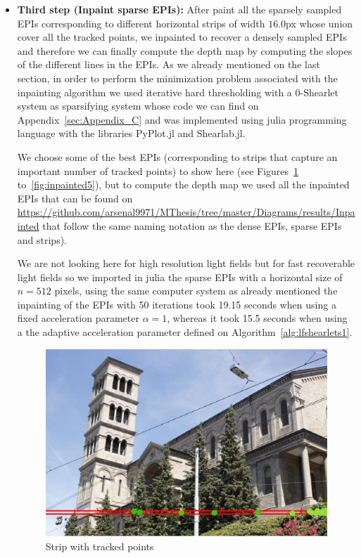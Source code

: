 \begin{itemize}
\item \textbf{Third step (Inpaint sparse EPIs):} After paint all the sparsely sampled EPIs corresponding to different horizontal strips of width $16.0$px whose union cover all the tracked points, we inpainted to recover a densely sampled EPIs and therefore we can finally compute the depth map by computing the slopes of the different lines in the EPIs. As we already mentioned on the last section, in order to perform the minimization problem associated with the inpainting algorithm we used iterative hard thresholding with a $0$-Shearlet system as sparsifying system whose code we can find on Appendix~\ref{sec:Appendix_C} and was implemented using julia programming language with the libraries PyPlot.jl and Shearlab.jl. 

\bigskip

We choose some of the best EPIs (corresponding to strips that capture an important number of tracked points) to show here (see Figures~\ref{fig:strip1} to~\ref{fig:inpainted5}), but to compute the depth map we used all the inpainted EPIs that can be found on \url{https://github.com/arsenal9971/MThesis/tree/master/Diagrams/results/Inpainted} that follow the same naming notation as the dense EPIs, sparse EPIs and strips).

\bigskip

We are not looking here for high resolution light fields but for fast recoverable light fields so we imported in julia the sparse EPIs with a horizontal size of $n=512$ pixels, using the same computer system as already mentioned the inpainting of the EPIs with 50 iterations took 19.15 seconds when using a fixed acceleration parameter $\alpha = 1$, whereas it took 15.5 seconds when using a the adaptive acceleration parameter defined on Algorithm~\ref{alg:lfshearlets1}.

\begin{figure}[h!]
\centering
\includegraphics[width = 0.7 \textwidth]{./Diagrams/results/EPIs/392_8_102_7_15_4_strip.png}
\caption{Strip with tracked points}
\label{fig:strip1}
\end{figure}


\end{itemize}
